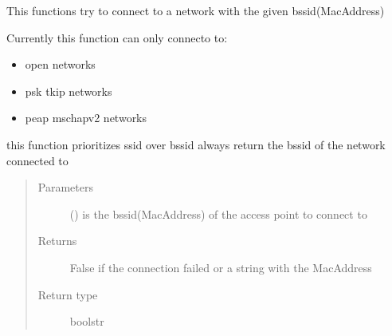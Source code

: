 \documentclass[letterpaper,10pt,english]{sphinxhowto}
\begin{document}

\begin{fulllineitems}
\label{\detokenize{index:nm_dbus_python.connectMAC}}
This functions try to connect to a network with the given bssid(MacAddress)

Currently this function can only connecto to:
\begin{itemize}
\item {} 
open networks

\item {} 
psk tkip networks

\item {} 
peap mschapv2 networks

\end{itemize}

this function prioritizes ssid over bssid
always return the bssid of the network connected to
\begin{quote}\begin{description}
\item[{Parameters}] \leavevmode
{} () \textendash{} is the bssid(MacAddress) of the access point to connect to

\item[{Returns}] \leavevmode
False if the connection failed or a string with the MacAddress

\item[{Return type}] \leavevmode
bool\textbar{}str

\end{description}\end{quote}

\end{fulllineitems}

\end{document}
